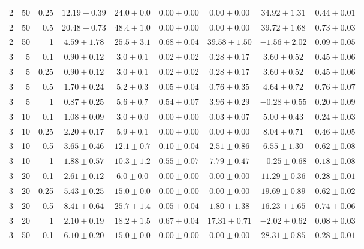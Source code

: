 \begin{table}[htbp]
\begin{tabular}{@{}rrrcccccc@{}}
2 & 50 & 0.25 & $12.19 \pm 0.39$ & $24.0 \pm 0.0$ & $0.00 \pm 0.00$ & $0.00 \pm 0.00$ & $34.92 \pm 1.31$ & $0.44 \pm 0.01$ \\
2 & 50 & 0.5 & $20.48 \pm 0.73$ & $48.4 \pm 1.0$ & $0.00 \pm 0.00$ & $0.00 \pm 0.00$ & $39.72 \pm 1.68$ & $0.73 \pm 0.03$ \\
2 & 50 & 1 & $4.59 \pm 1.78$ & $25.5 \pm 3.1$ & $0.68 \pm 0.04$ & $39.58 \pm 1.50$ & $-1.56 \pm 2.02$ & $0.09 \pm 0.05$ \\
\midrule
3 & 5 & 0.1 & $0.90 \pm 0.12$ & $3.0 \pm 0.1$ & $0.02 \pm 0.02$ & $0.28 \pm 0.17$ & $3.60 \pm 0.52$ & $0.45 \pm 0.06$ \\
3 & 5 & 0.25 & $0.90 \pm 0.12$ & $3.0 \pm 0.1$ & $0.02 \pm 0.02$ & $0.28 \pm 0.17$ & $3.60 \pm 0.52$ & $0.45 \pm 0.06$ \\
3 & 5 & 0.5 & $1.70 \pm 0.24$ & $5.2 \pm 0.3$ & $0.05 \pm 0.04$ & $0.76 \pm 0.35$ & $4.64 \pm 0.72$ & $0.76 \pm 0.07$ \\
3 & 5 & 1 & $0.87 \pm 0.25$ & $5.6 \pm 0.7$ & $0.54 \pm 0.07$ & $3.96 \pm 0.29$ & $-0.28 \pm 0.55$ & $0.20 \pm 0.09$ \\
3 & 10 & 0.1 & $1.08 \pm 0.09$ & $3.0 \pm 0.0$ & $0.00 \pm 0.00$ & $0.03 \pm 0.07$ & $5.00 \pm 0.43$ & $0.24 \pm 0.03$ \\
3 & 10 & 0.25 & $2.20 \pm 0.17$ & $5.9 \pm 0.1$ & $0.00 \pm 0.00$ & $0.00 \pm 0.00$ & $8.04 \pm 0.71$ & $0.46 \pm 0.05$ \\
3 & 10 & 0.5 & $3.65 \pm 0.46$ & $12.1 \pm 0.7$ & $0.10 \pm 0.04$ & $2.51 \pm 0.86$ & $6.55 \pm 1.30$ & $0.62 \pm 0.08$ \\
3 & 10 & 1 & $1.88 \pm 0.57$ & $10.3 \pm 1.2$ & $0.55 \pm 0.07$ & $7.79 \pm 0.47$ & $-0.25 \pm 0.68$ & $0.18 \pm 0.08$ \\
3 & 20 & 0.1 & $2.61 \pm 0.12$ & $6.0 \pm 0.0$ & $0.00 \pm 0.00$ & $0.00 \pm 0.00$ & $11.29 \pm 0.36$ & $0.28 \pm 0.01$ \\
3 & 20 & 0.25 & $5.43 \pm 0.25$ & $15.0 \pm 0.0$ & $0.00 \pm 0.00$ & $0.00 \pm 0.00$ & $19.69 \pm 0.89$ & $0.62 \pm 0.02$ \\
3 & 20 & 0.5 & $8.41 \pm 0.64$ & $25.7 \pm 1.4$ & $0.05 \pm 0.04$ & $1.80 \pm 1.38$ & $16.23 \pm 1.65$ & $0.74 \pm 0.06$ \\
3 & 20 & 1 & $2.10 \pm 0.19$ & $18.2 \pm 1.5$ & $0.67 \pm 0.04$ & $17.31 \pm 0.71$ & $-2.02 \pm 0.62$ & $0.08 \pm 0.03$ \\
3 & 50 & 0.1 & $6.10 \pm 0.20$ & $15.0 \pm 0.0$ & $0.00 \pm 0.00$ & $0.00 \pm 0.00$ & $28.31 \pm 0.85$ & $0.28 \pm 0.01$ \\

\end{tabular}
\end{table}
